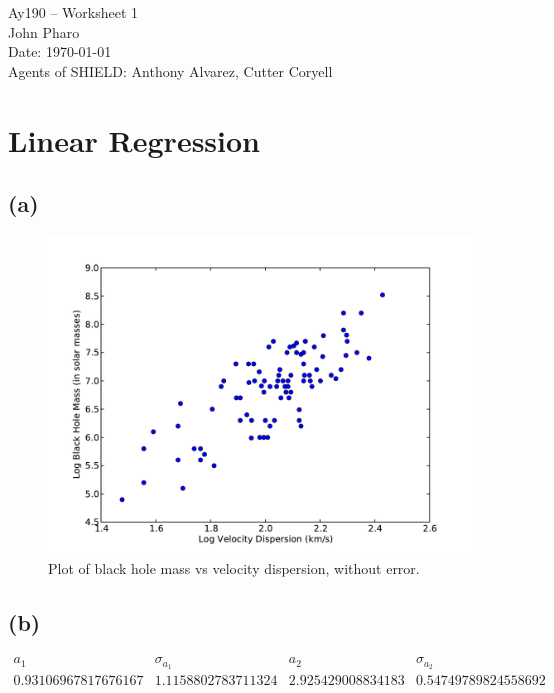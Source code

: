 \documentclass[11pt,letterpaper]{article}
\begin{document}
\begin{center}
\Large
Ay190 -- Worksheet 1\\
John Pharo\\
Date: \today \\
Agents of SHIELD: Anthony Alvarez, Cutter Coryell
\end{center}

\section*{Linear Regression}

\subsection*{(a)}

\begin{figure}[!htb]\centering
  \includegraphics[width=1\textwidth]{PartA}
  \caption{Plot of black hole mass vs velocity dispersion, without error.}
  \end{figure}

\subsection*{(b)}

\[
\begin{array}{cccc}
a_1 & \sigma_{a_1} & a_2 & \sigma_{a_2} \\
0.93106967817676167 & 1.1158802783711324 & 2.925429008834183 & 0.54749789824558692
\end{array}
\]
\end{document}
